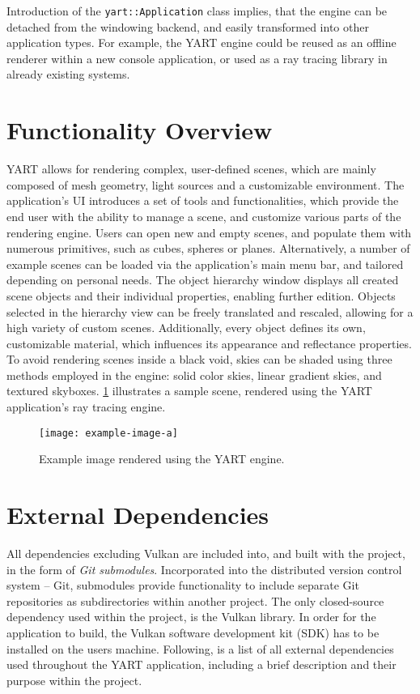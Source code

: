 Introduction of the \verb|yart::Application| class implies, that the engine can be detached from the windowing backend, and easily transformed into other application types.
For example, the YART engine could be reused as an offline renderer within a new console application, or used as a ray tracing library in already existing systems.

\section{Functionality Overview}

YART allows for rendering complex, user-defined scenes, which are mainly composed of mesh geometry, light sources and a customizable environment.
The application's UI introduces a set of tools and functionalities, which provide the end user with the ability to manage a scene, and customize various parts of the rendering engine.
Users can open new and empty scenes, and populate them with numerous primitives, such as cubes, spheres or planes.
Alternatively, a number of example scenes can be loaded via the application's main menu bar, and tailored depending on personal needs. 
The object hierarchy window displays all created scene objects and their individual properties, enabling further edition.
Objects selected in the hierarchy view can be freely translated and rescaled, allowing for a high variety of custom scenes.
Additionally, every object defines its own, customizable material, which influences its appearance and reflectance properties.
To avoid rendering scenes inside a black void, skies can be shaded using three methods employed in the engine: solid color skies, linear gradient skies, and textured skyboxes.
\cref{fig:Application/FunctionalityOverview/render_sample} illustrates a sample scene, rendered using the YART application's ray tracing engine.

\begin{figure}[!ht]
    \centering
    \texttt{[image: example-image-a]}
    \caption[Example image rendered using the YART engine]{Example image rendered using the YART engine.}
    \label{fig:Application/FunctionalityOverview/render_sample}
\end{figure}

\section{External Dependencies}

All dependencies excluding Vulkan are included into, and built with the project, in the form of \textit{Git submodules}. 
Incorporated into the distributed version control system -- Git, submodules provide functionality to include separate Git repositories as subdirectories within another project.
The only closed-source dependency used within the project, is the Vulkan library.
In order for the application to build, the Vulkan software development kit (SDK) has to be installed on the users machine. 
Following, is a list of all external dependencies used throughout the YART application, including a brief description and their purpose within the project.

